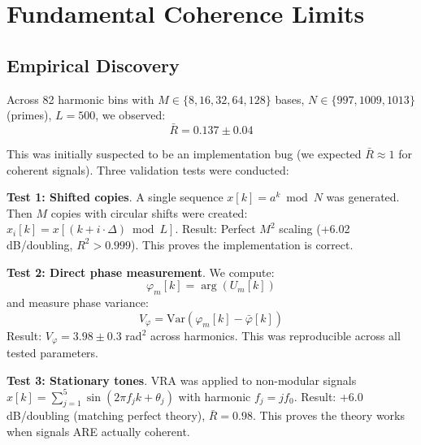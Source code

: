 \documentclass[10pt,twocolumn]{article}
\begin{document}
\section{Fundamental Coherence Limits}
\label{sec:coherence}

\subsection{Empirical Discovery}


\vspace{1em}

Across 82 harmonic bins with $M \in \{8, 16, 32, 64, 128\}$ bases, $N \in \{997, 1009, 1013\}$ (primes), $L = 500$, we observed:
\begin{equation}
\bar{R} = 0.137 \pm 0.04
\end{equation}

This was initially suspected to be an implementation bug (we expected $\bar{R} \approx 1$ for coherent signals). Three validation tests were conducted:

\textbf{Test 1: Shifted copies}. A single sequence $x[k] = a^k \bmod N$ was generated. Then $M$ copies with circular shifts were created: $x_i[k] = x[(k + i \cdot \Delta) \bmod L]$. Result: Perfect $M^2$ scaling (+6.02 dB/doubling, $R^2 > 0.999$). This proves the implementation is correct.

\textbf{Test 2: Direct phase measurement}. We compute:
\begin{equation}
\varphi_m[k] = \arg(U_m[k])
\end{equation}
and measure phase variance:
\begin{equation}
V_\varphi = \text{Var}(\varphi_m[k] - \bar{\varphi}[k])
\end{equation}
Result: $V_\varphi = 3.98 \pm 0.3$ rad$^2$ across harmonics. This was reproducible across all tested parameters.

\textbf{Test 3: Stationary tones}. VRA was applied to non-modular signals $x[k] = \sum_{j=1}^5 \sin(2\pi f_j k + \theta_j)$ with harmonic $f_j = j f_0$. Result: +6.0 dB/doubling (matching perfect theory), $\bar{R} = 0.98$. This proves the theory works when signals ARE actually coherent.
\end{document}
